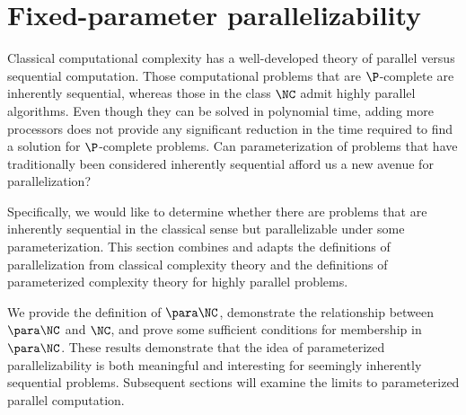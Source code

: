 \section{Fixed-parameter parallelizability}
\label{sec:pcompletefpp}

%
%
%
Classical computational complexity has a well-developed theory of parallel versus sequential computation.
Those computational problems that are $\P$-complete are inherently sequential, whereas those in the class $\NC$ admit highly parallel algorithms.
Even though they can be solved in polynomial time, adding more processors does not provide any significant reduction in the time required to find a solution for $\P$-complete problems.
%
%
Can parameterization of problems that have traditionally been considered inherently sequential afford us a new avenue for parallelization?

%
%
%
Specifically, we would like to determine whether there are problems that are inherently sequential in the classical sense but parallelizable under some parameterization.
%
%
%
This section combines and adapts the definitions of parallelization from classical complexity theory and the definitions of parameterized complexity theory for highly parallel problems.
%

%
%
%
We provide the definition of $\para \NC$, demonstrate the relationship between $\para \NC$ and $\NC$, and prove some sufficient conditions for membership in $\para \NC$.
%
%
%
These results demonstrate that the idea of parameterized parallelizability is both meaningful and interesting for seemingly inherently sequential problems.
%
%
Subsequent sections will examine the limits to parameterized parallel computation.

